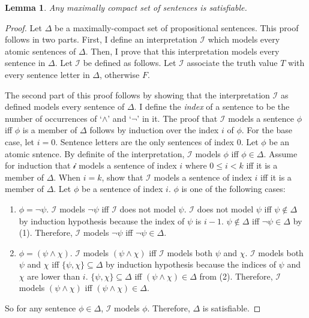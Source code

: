 \documentclass[12pt]{article}
\newtheorem{lemma}[theorem]{Lemma}
\theoremstyle{definition}
\theoremstyle{remark}
\begin{document}
\begin{lemma}
	\label{lem:prop-sat}
	Any maximally compact set of sentences is satisfiable.
\end{lemma}

\begin{proof}
	Let $\Delta$ be a maximally-compact set of propositional sentences. This proof follows in two parts. First, I define an interpretation $\mathscr{I}$ which models every atomic sentences of $\Delta$. Then, I prove that this interpretation models every sentence in $\Delta$. Let $\mathscr{I}$ be defined as follows. Let $\mathscr{I}$ associate the truth value $T$ with every sentence letter in $\Delta$, otherwise $F$.
	
	The second part of this proof follows by showing that the interpretation $\mathscr{I}$ as defined models every sentence of $\Delta$. I define the \textit{index} of a sentence to be the number of occurrences of `$\land$' and `$\neg$' in it.  The proof that $\mathscr{I}$ models a sentence $\phi$ iff $\phi$ is a member of $\Delta$ follows by induction over the index $i$ of $\phi$. For the base case, let $i=0$. Sentence letters are the only sentences of index 0. Let $\phi$ be an atomic sntence. By definite of the interpretation, $\mathscr{I}$ models $\phi$ iff $\phi \in \Delta$. Assume for induction that $\mathscr{i}$ models a sentence of index $i$ where $0 \leq i < k$ iff it is a member of $\Delta$. When $i=k$, show that $\mathscr{I}$ models a sentence of index $i$ iff it is a member of $\Delta$. Let $\phi$ be a sentence of index $i$. $\phi$ is one of the following cases: 
	
	\begin{enumerate}
		\item $\phi = \neg\psi$. $\mathscr{I}$ models $\neg\psi$ iff $\mathscr{I}$ does not model $\psi$. $\mathscr{I}$ does not model $\psi$ iff $\psi \not\in \Delta$ by induction hypothesis because the index of $\psi$ is $i-1$. $\psi \not\in \Delta$ iff $\neg\psi \in \Delta$ by (1). Therefore, $\mathscr{I}$ models $\neg\psi$ iff $\neg\psi \in \Delta$.
		\item $\phi = (\psi \land \chi)$. $\mathscr{I}$ models $(\psi \land \chi)$ iff $\mathscr{I}$ models both $\psi$ and $\chi$. $\mathscr{I}$ models both $\psi$ and $\chi$ iff $\{ \psi, \chi \} \subseteq \Delta$ by induction hypothesis because the indices of $\psi$ and $\chi$ are lower than $i$. $\{ \psi, \chi \} \subseteq \Delta$ iff $(\psi \land \chi) \in \Delta$ from (2). Therefore, $\mathscr{I}$ models $(\psi \land \chi)$ iff $(\psi \land \chi) \in \Delta$.
	\end{enumerate}

	So for any sentence $\phi \in \Delta$, $\mathscr{I}$ models $\phi$. Therefore, $\Delta$ is satisfiable.
\end{proof}
\end{document}
